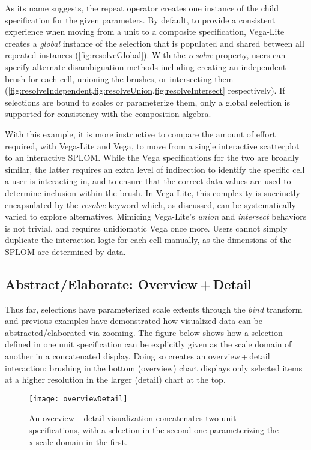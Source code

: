 As its name suggests, the repeat operator creates one instance of the child
specification for the given parameters. By default, to provide a consistent
experience when moving from a unit to a composite specification, Vega-Lite
creates a \emph{global} instance of the selection that is populated and shared
between all repeated instances (\cref{fig:resolveGlobal}). With the
\emph{resolve} property, users can specify alternate disambiguation methods
including creating an independent brush for each cell, unioning the brushes, or
intersecting them
(\cref{fig:resolveIndependent,fig:resolveUnion,fig:resolveIntersect}
respectively). If selections are bound to scales or parameterize them, only a
global selection is supported for consistency with the composition algebra.

With this example, it is more instructive to compare the amount of effort
required, with Vega-Lite and Vega, to move from a single interactive scatterplot
to an interactive SPLOM. While the Vega specifications for the two are broadly
similar, the latter requires an extra level of indirection to identify the
specific cell a user is interacting in, and to ensure that the correct data
values are used to determine inclusion within the brush. In Vega-Lite, this
complexity is succinctly encapsulated by the \emph{resolve} keyword which, as
discussed, can be systematically varied to explore alternatives. Mimicing
Vega-Lite's \emph{union} and \emph{intersect} behaviors is not trivial, and
requires unidiomatic Vega once more. Users cannot simply duplicate the
interaction logic for each cell manually, as the dimensions of the SPLOM are
determined by data.

\subsection{Abstract/Elaborate: Overview\,+\,Detail}

Thus far, selections have parameterized scale extents through the \emph{bind}
transform and previous examples have demonstrated how visualized data can be
abstracted/elaborated via zooming. The figure below shows how a selection
defined in one unit specification can be explicitly given as the scale domain of
another in a concatenated display. Doing so creates an overview\,+\,detail
interaction: brushing in the bottom (overview) chart displays only selected
items at a higher resolution in the larger (detail) chart at the top.

\begin{figure}[h!]
  \centering
  \texttt{[image: overviewDetail]}
  \caption{An overview\,+\,detail visualization concatenates two unit
  specifications, with a selection in the second one parameterizing the x-scale
  domain in the first.}
  \label{fig:overviewDetail}
\end{figure}

